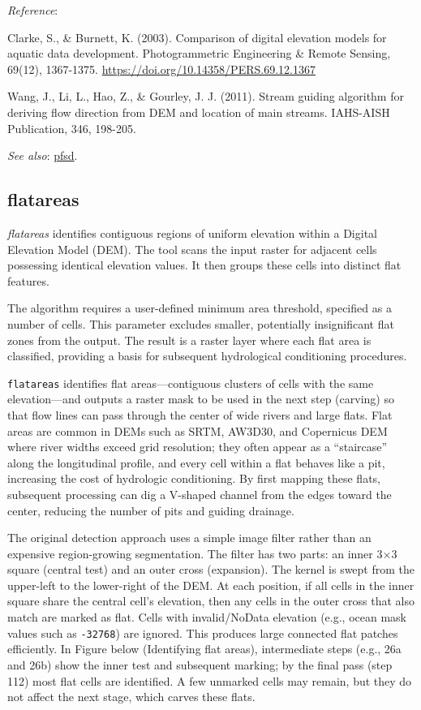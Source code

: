 \documentclass[
]{book}
\begin{document}
\emph{Reference}:

Clarke, S., \& Burnett, K. (2003). Comparison of digital elevation models for aquatic data development. Photogrammetric Engineering \& Remote Sensing, 69(12), 1367-1375. \url{https://doi.org/10.14358/PERS.69.12.1367}

Wang, J., Li, L., Hao, Z., \& Gourley, J. J. (2011). Stream guiding algorithm for deriving flow direction from DEM and location of main streams. IAHS-AISH Publication, 346, 198-205.

\emph{See also}: \hyperref[pfsd]{pfsd}.

\subsection{flatareas}\label{flatareas}

\emph{flatareas} identifies contiguous regions of uniform elevation within a Digital Elevation Model (DEM). The tool scans the input raster for adjacent cells possessing identical elevation values. It then groups these cells into distinct flat features.

The algorithm requires a user-defined minimum area threshold, specified as a number of cells. This parameter excludes smaller, potentially insignificant flat zones from the output. The result is a raster layer where each flat area is classified, providing a basis for subsequent hydrological conditioning procedures.

\texttt{flatareas} identifies flat areas---contiguous clusters of cells with the same elevation---and outputs a raster mask to be used in the next step (carving) so that flow lines can pass through the center of wide rivers and large flats. Flat areas are common in DEMs such as SRTM, AW3D30, and Copernicus DEM where river widths exceed grid resolution; they often appear as a ``staircase'' along the longitudinal profile, and every cell within a flat behaves like a pit, increasing the cost of hydrologic conditioning. By first mapping these flats, subsequent processing can dig a V-shaped channel from the edges toward the center, reducing the number of pits and guiding drainage.

The original detection approach uses a simple image filter rather than an expensive region-growing segmentation. The filter has two parts: an inner 3×3 square (central test) and an outer cross (expansion). The kernel is swept from the upper-left to the lower-right of the DEM. At each position, if all cells in the inner square share the central cell's elevation, then any cells in the outer cross that also match are marked as flat. Cells with invalid/NoData elevation (e.g., ocean mask values such as \texttt{-32768}) are ignored. This produces large connected flat patches efficiently. In Figure below (Identifying flat areas), intermediate steps (e.g., 26a and 26b) show the inner test and subsequent marking; by the final pass (step 112) most flat cells are identified. A few unmarked cells may remain, but they do not affect the next stage, which carves these flats.
\end{document}
